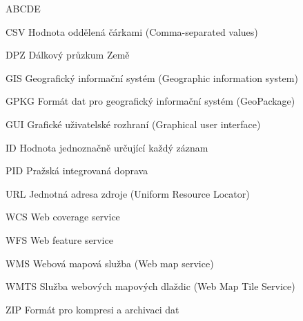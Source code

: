 
\begin{seznamzkratek}{ABCDE}      
	             	                   
          {CSV}
          {Hodnota oddělená čárkami (Comma-separated values)} 
          
	      {DPZ}
	      {Dálkový průzkum Země}  
          
	      {GIS}
	      {Geografický informační systém (Geographic information system)}
          
	      {GPKG}
	      {Formát dat pro geografický informační systém (GeoPackage)}
          
	      {GUI}
	      {Grafické uživatelské rozhraní (Graphical user interface)}
	               	             
	      {ID}
	      {Hodnota jednoznačně určující každý záznam} 	      	     

	      {PID}
	      {Pražská integrovaná doprava} 	
	          
          {URL}
          {Jednotná adresa zdroje (Uniform Resource Locator)}                
          
	      {WCS}
	      {Web coverage service}
                                          
	      {WFS}
	      {Web feature service}         
            
	      {WMS}
	      {Webová mapová služba (Web map service)} 	

	      {WMTS}
	      {Služba webových mapových dlaždic (Web Map Tile Service)} 
          
          {ZIP}
          {Formát pro kompresi a archivaci dat} 	
          
	      	      
\end{seznamzkratek}